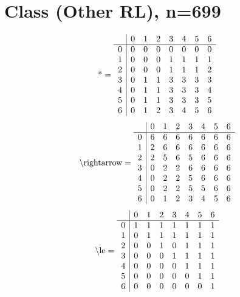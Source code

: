 \documentclass[11pt]{article}
\begin{document}
\section{Class (Other RL), n=699}
\[\text{*} = 
\begin{array}{r | r r r r r r r}
 & 0 & 1 & 2 & 3 & 4 & 5 & 6 \\ \hline
0 & 0 & 0 & 0 & 0 & 0 & 0 & 0 \\
1 & 0 & 0 & 0 & 1 & 1 & 1 & 1 \\
2 & 0 & 0 & 0 & 1 & 1 & 1 & 2 \\
3 & 0 & 1 & 1 & 3 & 3 & 3 & 3 \\
4 & 0 & 1 & 1 & 3 & 3 & 3 & 4 \\
5 & 0 & 1 & 1 & 3 & 3 & 3 & 5 \\
6 & 0 & 1 & 2 & 3 & 4 & 5 & 6 \\
\end{array}
\]
\[\text{\textbackslash rightarrow} = 
\begin{array}{r | r r r r r r r}
 & 0 & 1 & 2 & 3 & 4 & 5 & 6 \\ \hline
0 & 6 & 6 & 6 & 6 & 6 & 6 & 6 \\
1 & 2 & 6 & 6 & 6 & 6 & 6 & 6 \\
2 & 2 & 5 & 6 & 5 & 6 & 6 & 6 \\
3 & 0 & 2 & 2 & 6 & 6 & 6 & 6 \\
4 & 0 & 2 & 2 & 5 & 6 & 6 & 6 \\
5 & 0 & 2 & 2 & 5 & 5 & 6 & 6 \\
6 & 0 & 1 & 2 & 3 & 4 & 5 & 6 \\
\end{array}
\]
\[\text{\textbackslash le} = 
\begin{array}{r | r r r r r r r}
 & 0 & 1 & 2 & 3 & 4 & 5 & 6 \\ \hline
0 & 1 & 1 & 1 & 1 & 1 & 1 & 1 \\
1 & 0 & 1 & 1 & 1 & 1 & 1 & 1 \\
2 & 0 & 0 & 1 & 0 & 1 & 1 & 1 \\
3 & 0 & 0 & 0 & 1 & 1 & 1 & 1 \\
4 & 0 & 0 & 0 & 0 & 1 & 1 & 1 \\
5 & 0 & 0 & 0 & 0 & 0 & 1 & 1 \\
6 & 0 & 0 & 0 & 0 & 0 & 0 & 1 \\
\end{array}
\]
\end{document}
